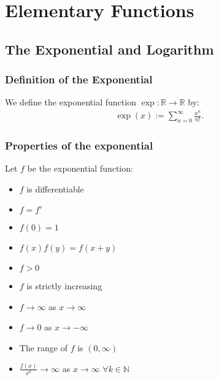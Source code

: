 \documentclass[a4paper, 12pt, twoside]{article}
\begin{document}
\section{Elementary Functions}

\subsection{The Exponential and Logarithm}

\subsubsection{Definition of the Exponential}

We define the exponential function $\exp : \mathbb{R} \to \mathbb{R}$ by:
\begin{align*}
      \exp(x) := \sum_{n = 0}^\infty \frac{x^n}{n!}.
\end{align*}

\subsubsection{Properties of the exponential}

Let $f$ be the exponential function:

\begin{multicols}{2}
      \begin{itemize}
            \item $f$ is differentiable
            \item $f = f'$
            \item $f(0) = 1$
            \item $f(x)f(y) = f(x + y)$
            \item $f > 0$
      \end{itemize}
      \columnbreak
      \begin{itemize}
            \item $f$ is strictly increasing
            \item $f \to \infty$ as $x \to \infty$
            \item $f \to 0$ as $x \to -\infty$
            \item The range of $f$ is $(0, \infty)$
            \item $\frac{f(x)}{x^k} \to \infty$ as 
                  $x \to \infty$ $\forall k \in \mathbb{N}$
      \end{itemize}
\end{multicols}
\end{document}
